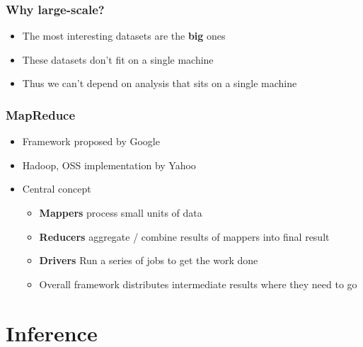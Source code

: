 
\begin{frame}
	\frametitle{Why large-scale?}
	
	\begin{itemize}
		\item The most interesting datasets are the {\bf big} ones
		\item These datasets don't fit on a single machine
		\item Thus we can't depend on analysis that sits on a single machine
	\end{itemize}
\end{frame}

\begin{frame}
	\frametitle{MapReduce}
	
	\begin{itemize}
		\item Framework proposed by Google~\cite{dean-04}
		\item Hadoop, OSS implementation by Yahoo~\cite{white-10}
		\item Central concept
			\begin{itemize}
				\item {\bf Mappers} process small units of data
				\item {\bf Reducers} aggregate / combine results of mappers into final result
				\item {\bf Drivers} Run a series of jobs to get the work done
				\item Overall framework distributes intermediate results where they need to go
			\end{itemize}
	\end{itemize}

\end{frame}



\section{Inference}

